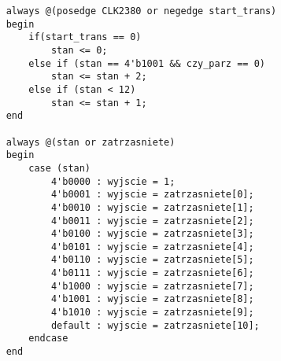 \begin{lstlisting}
	always @(posedge CLK2380 or negedge start_trans)
	begin
		if(start_trans == 0)
			stan <= 0;
		else if (stan == 4'b1001 && czy_parz == 0)
			stan <= stan + 2;
		else if (stan < 12)
			stan <= stan + 1;
	end
	
	always @(stan or zatrzasniete)
	begin
		case (stan)
			4'b0000 : wyjscie = 1;
			4'b0001 : wyjscie = zatrzasniete[0];
			4'b0010 : wyjscie = zatrzasniete[1];
			4'b0011 : wyjscie = zatrzasniete[2];
			4'b0100 : wyjscie = zatrzasniete[3];
			4'b0101 : wyjscie = zatrzasniete[4];
			4'b0110 : wyjscie = zatrzasniete[5];
			4'b0111 : wyjscie = zatrzasniete[6];
			4'b1000 : wyjscie = zatrzasniete[7];
			4'b1001 : wyjscie = zatrzasniete[8];
			4'b1010 : wyjscie = zatrzasniete[9];
			default : wyjscie = zatrzasniete[10];
		endcase
	end
\end{lstlisting}